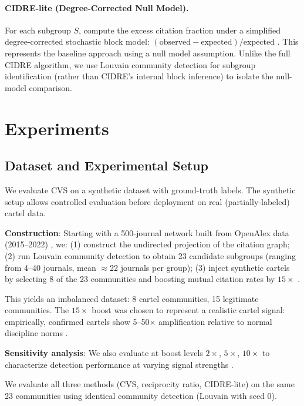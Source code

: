 \documentclass[11pt,letterpaper]{article}
\begin{document}
\paragraph{CIDRE-lite (Degree-Corrected Null Model).}
For each subgroup $S$, compute the excess citation fraction under a simplified degree-corrected stochastic block model: $(\text{observed} - \text{expected}) / \text{expected}$ \citep{Kojaku2021}. This represents the baseline approach using a null model assumption. Unlike the full CIDRE algorithm, we use Louvain community detection for subgroup identification (rather than CIDRE's internal block inference) to isolate the null-model comparison.

\section{Experiments}

\subsection{Dataset and Experimental Setup}

We evaluate CVS on a synthetic dataset with ground-truth labels. The synthetic setup allows controlled evaluation before deployment on real (partially-labeled) cartel data.

\textbf{Construction}: Starting with a 500-journal network built from OpenAlex data (2015--2022) \citep{Priem2022}, we: (1) construct the undirected projection of the citation graph; (2) run Louvain community detection to obtain 23 candidate subgroups (ranging from 4--40 journals, mean $\approx$22 journals per group); (3) inject synthetic cartels by selecting 8 of the 23 communities and boosting mutual citation rates by $15\times$ \citep{Newman2003}.

This yields an imbalanced dataset: 8 cartel communities, 15 legitimate communities. The $15\times$ boost was chosen to represent a realistic cartel signal: empirically, confirmed cartels show 5--50$\times$ amplification relative to normal discipline norms \citep{Kojaku2021}.

\textbf{Sensitivity analysis}: We also evaluate at boost levels $2\times$, $5\times$, $10\times$ to characterize detection performance at varying signal strengths \citep{Newman2003}.

We evaluate all three methods (CVS, reciprocity ratio, CIDRE-lite) on the same 23 communities using identical community detection (Louvain with seed 0).
\end{document}
